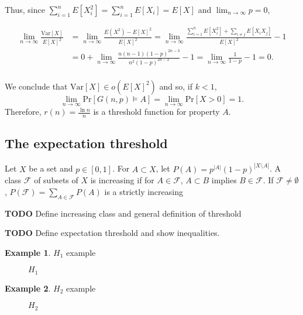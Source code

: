 \documentclass[12pt]{article}
\theoremstyle{definition}
\newtheorem{exmp}{Example}[section]
\theoremstyle{remark}
\def\Pr{\ensuremath{\mbox{Pr}}}
\begin{document}
Thus, since $\sum_{i = 1}^{n}E[X_i^2] =  \sum_{i = 1}^n E[X_i] = E[X]$ and $\lim_{n \to \infty} p = 0$,

\begin{align*}
    \lim_{n \to \infty} \frac{\text{Var}[X]}{E[X]^2} &= 
    \lim_{n \to \infty}\frac{E(X^2) - E[X]^2}{E[X]^2} = \lim_{n \to \infty} \frac{\sum_{i = 1}^n E[X_i^2] + \sum_{i \neq j}E[X_iX_j]}{E[X]^2} - 1 \\ &= 0 + \lim_{n \to \infty} \frac{ n(n - 1)(1 - p)^{2n - 3}}{n^2(1 - p)^{2n - 2}} - 1= \lim_{n \to \infty} \frac{1}{1 - p} - 1 = 0.\\
\end{align*} \par
We conclude that $\text{Var}[X] \in o(E[X]^2)$ and so, if $k < 1$, \[\lim_{n \to \infty} \Pr[G(n, p) \vDash A] = \lim_{n \to \infty} \Pr[X > 0] = 1.\] Therefore, $r(n) = \frac{\ln n}{n}$ is a threshold function for property $A$.

\subsection{The expectation threshold}

Let $X$ be a set and $p \in [0, 1]$. For $A \subset X$, let $P(A) = p^{|A|}(1 - p)^{|X \setminus A|}$. A class $\mathcal{F}$ of subsets of $X$ is increasing if for $A \in \mathcal{F}$, $A \subset B$ implies $B \in \mathcal{F}$. If $\mathcal{F} \neq \emptyset$,  $P(\mathcal{F}) = \sum_{A \in \mathcal{F}} P(A)$ is a strictly increasing 
 
\textbf{TODO} Define increasing class and general definition of threshold \cite{park2022proof} 

\noindent \textbf{TODO} Define expectation threshold and show inequalities. \cite{frankston2021thresholds}

\begin{exmp}
    $H_1$ example
    \begin{figure}[h]
        \centering
        \caption{$H_1$}
        \label{H1}
    \end{figure}
\end{exmp}

\begin{exmp}
    $H_2$ example
    \begin{figure}[h]
        \centering
        \caption{$H_2$}
        \label{H2}
    \end{figure}
    
\end{exmp}
\end{document}

